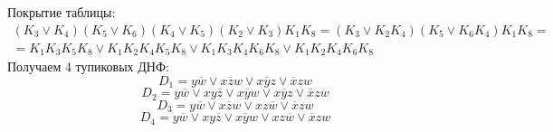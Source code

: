 \documentclass[11pt]{article}
\begin{document}
Покрытие таблицы:
\begin{multline}
(K_3 \vee K_4)(K_5 \vee K_6)(K_4 \vee K_5)(K_2 \vee K_3)K_1K_8 = (K_3 \vee K_2K_4)(K_5 \vee K_6K_4)K_1K_8 = \\
= K_1K_3K_5K_8 \vee K_1K_2K_4K_5K_8 \vee K_1K_3K_4K_6K_8 \vee K_1K_2K_4K_6K_8
\end{multline}
Получаем 4 тупиковых ДНФ:
\begin{equation}
D_1 = y\overline{w} \vee x\overline{z}w \vee x\overline{y}z \vee \overline{x}zw
\end{equation}
\begin{equation}
D_2 = y\overline{w} \vee xy\overline{z} \vee x\overline{y}w \vee x\overline{y}z \vee \overline{x}zw
\end{equation}
\begin{equation}
D_3 = y\overline{w} \vee x\overline{z}w \vee xz\overline{w} \vee \overline{x}zw
\end{equation}
\begin{equation}
D_4 = y\overline{w} \vee xy\overline{z} \vee x\overline{y}w \vee xz\overline{w} \vee \overline{x}zw
\end{equation}
\end{document}
